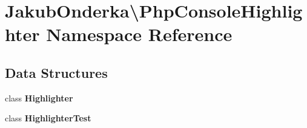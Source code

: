 \section{Jakub\+Onderka\textbackslash{}Php\+Console\+Highlighter Namespace Reference}
\label{namespace_jakub_onderka_1_1_php_console_highlighter}
\subsection*{Data Structures}
\begin{DoxyCompactItemize}
\item 
class {\bf Highlighter}
\item 
class {\bf Highlighter\+Test}
\end{DoxyCompactItemize}
